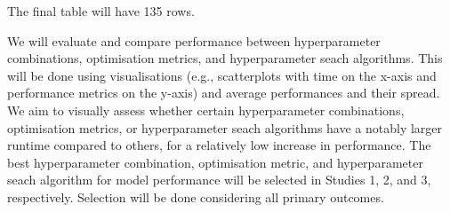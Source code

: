 \documentclass{article}
\begin{document}
\begin{table}
    \centering
    \caption{Study 3 outcome table.}
    \begin{tablenotes}
      \small
      \item The final table will have 135 rows.
    \end{tablenotes}
    \label{tab:study3}
\end{table}

We will evaluate and compare performance between hyperparameter combinations, optimisation metrics, and hyperparameter seach algorithms. This will be done using visualisations (e.g., scatterplots with time on the x-axis and performance metrics on the y-axis) and average performances and their spread. We aim to visually assess whether certain hyperparameter combinations, optimisation metrics, or hyperparameter seach algorithms have a notably larger runtime compared to others, for a relatively low increase in performance. The best hyperparameter combination, optimisation metric, and hyperparameter seach algorithm for model performance will be selected in Studies 1, 2, and 3, respectively. Selection will be done considering all primary outcomes.
\end{document}
